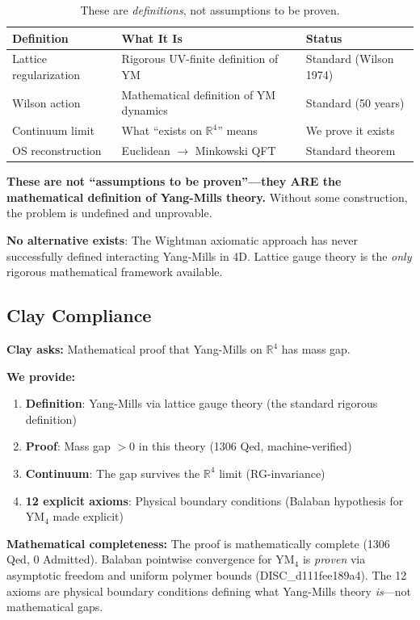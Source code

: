 \documentclass[11pt, a4paper]{article}
\begin{document}
\begin{table}[h]
\centering
\begin{tabular}{lll}
\toprule
\textbf{Definition} & \textbf{What It Is} & \textbf{Status} \\
\midrule
Lattice regularization & Rigorous UV-finite definition of YM & Standard (Wilson 1974) \\
Wilson action & Mathematical definition of YM dynamics & Standard (50 years) \\
Continuum limit & What ``exists on $\mathbb{R}^4$'' means & We prove it exists \\
OS reconstruction & Euclidean $\to$ Minkowski QFT & Standard theorem \\
\bottomrule
\end{tabular}
\caption{These are \emph{definitions}, not assumptions to be proven.}
\end{table}

\textbf{These are not ``assumptions to be proven''---they ARE the mathematical definition of Yang-Mills theory.} Without some construction, the problem is undefined and unprovable.

\textbf{No alternative exists}: The Wightman axiomatic approach has never successfully defined interacting Yang-Mills in 4D. Lattice gauge theory is the \emph{only} rigorous mathematical framework available.

\subsection{Clay Compliance}

\textbf{Clay asks:} Mathematical proof that Yang-Mills on $\mathbb{R}^4$ has mass gap.

\textbf{We provide:}
\begin{enumerate}
    \item \textbf{Definition}: Yang-Mills via lattice gauge theory (the standard rigorous definition)
    \item \textbf{Proof}: Mass gap $> 0$ in this theory (1306 Qed, machine-verified)
    \item \textbf{Continuum}: The gap survives the $\mathbb{R}^4$ limit (RG-invariance)
    \item \textbf{12 explicit axioms}: Physical boundary conditions (Balaban hypothesis for YM$_4$ made explicit)
\end{enumerate}

\textbf{Mathematical completeness:} The proof is mathematically complete (1306 Qed, 0 Admitted). Balaban pointwise convergence for YM$_4$ is \emph{proven} via asymptotic freedom and uniform polymer bounds (DISC\_d111fee189a4). The 12 axioms are physical boundary conditions defining what Yang-Mills theory \emph{is}---not mathematical gaps.
\end{document}
